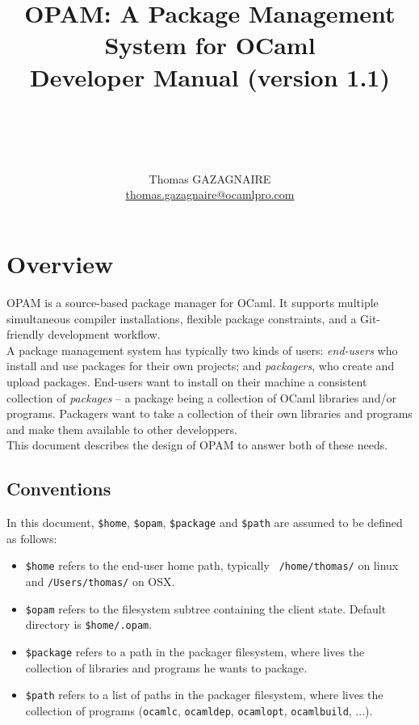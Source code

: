 \documentclass[a4paper,11pt]{article}
\title{
OPAM: A Package Management System for OCaml\\
Developer Manual (version 1.1)\\ ~\ \\
~\ \\}
\author{Thomas GAZAGNAIRE\\
\url{thomas.gazagnaire@ocamlpro.com}\\
}
\begin{document}
\maketitle

\vfill

\tableofcontents

\section*{Overview}

OPAM is a source-based package manager for OCaml. It supports multiple simultaneous
compiler installations, flexible package constraints, and a Git-friendly development
workflow.\\

A package management system has typically two kinds of users: {\em
  end-users} who install and use packages for their own projects; and
{\em packagers}, who create and upload packages. End-users want to
install on their machine a consistent collection of {\em packages} --
a package being a collection of OCaml libraries and/or programs.
Packagers want to take a collection of their own libraries and
programs and make them available to other developpers.\\

This document describes the design of OPAM to answer both of these needs.

\subsection*{Conventions}

In this document, \verb+$home+, \verb+$opam+, \verb+$package+ and
\verb+$path+ are assumed to be defined as follows:

\begin{itemize}

\item {\tt \$home} refers to the end-user home path, typically {\tt
  /home/thomas/} on linux and {\tt /Users/thomas/} on OSX.

\item {\tt \$opam} refers to the filesystem subtree containing the
  client state. Default directory is {\tt \$home/.opam}.

\item {\tt \$package} refers to a path in the packager filesystem, where
  lives the collection of libraries and programs he wants to package.

\item {\tt \$path} refers to a list of paths in the packager filesystem, where
  lives the collection of programs ({\tt ocamlc}, {\tt ocamldep}, {\tt ocamlopt},
  {\tt ocamlbuild}, ...).

\end{itemize}
\end{document}
